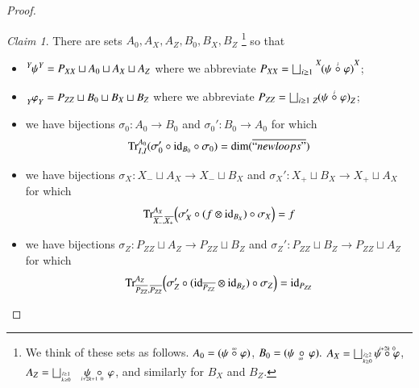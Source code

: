 \documentclass{amsart}
\def\tn{\textnormal}
\def\dim{\tn{dim}}
\def\Trace{\tn{Tr}}
\def\to{\rightarrow}
\def\ol{\overline}
\def\id{\tn{id}}
\newcommand{\inp}[1]{{#1_-}}
\newcommand{\outp}[1]{{#1_+}}
\newcommand{\feeddd}[3]{{\tensor*[^{#2}_{\color{white}{!}}]{{#1}}{^{#3}}}}%
\newcommand{\feedcc}[3]{{\tensor*[^{\color{white}{!}}_{#2}]{{#1}}{_{#3}}}}
\theoremstyle{remark}
\newtheorem{claim}[subsubsection]{Claim}
\theoremstyle{definition}
\begin{document}
\begin{proof}
\begin{claim}
 There are sets $A_0,A_X,A_Z,B_0,B_X,B_Z$%
 \footnote{We think of these sets as follows. $A_0=(\psi\;\accentset{\infty}{\circ}\;\varphi)$, $B_0=(\psi\,\underaccent{\;\ \infty}{\circ}\,\varphi).$ $A_X=\bigsqcup_{\substack{\scriptscriptstyle i\ge2\\ \scriptscriptstyle k\ge0}}\psi\;\accentset{i+2k\ 0}{\circ}\;\varphi$, $A_Z=\bigsqcup_{\substack{\scriptscriptstyle i\ge1\\ \scriptscriptstyle k\ge0}}\quad\psi\;\underaccent{i+2k+1\ 0\ \ \ }{\circ}\;\varphi$, and similarly for $B_X$ and $B_Z$.
}
so that
 \begin{itemize}
  \item $\feeddd{\psi}{Y}{Y}=P_{XX}\sqcup A_0\sqcup A_X\sqcup A_Z$ where we abbreviate $P_{XX}=\bigsqcup_{i\ge1}\feeddd{(\psi\;\accentset{i}{\circ}\;\varphi)}{X}{X}$;
  \item $\feedcc{\varphi}{Y}{Y}=P_{ZZ}\sqcup B_0\sqcup B_X\sqcup B_Z$ where we abbreviate $P_{ZZ}=\bigsqcup_{i\ge1}\feedcc{(\psi\;\accentset{i}{\circ}\;\varphi)}{Z}{Z}$;
  \item we have bijections $\sigma_0:A_0\to B_0$ and $\sigma_0':B_0\to A_0$ for which
  \[\Trace_{I,I}^{A_0}(\sigma_0'\circ\id_{B_0}\circ\sigma_0)=\dim(\ol{``newloops"})\]
  \item we have bijections $\sigma_X:\inp{X}\sqcup A_X\to \inp{X}\sqcup B_X$ and $\sigma_X':\outp{X}\sqcup B_X\to \outp{X}\sqcup A_X$ for which
  \[\Trace_{\ol{\inp{X}},\ol{\outp{X}}}^{A_X}\Big(\sigma_X'\circ(f\otimes\id_{B_X})\circ\sigma_X\Big)=f\]
  \item we have bijections $\sigma_Z:P_{ZZ}\sqcup A_Z\to P_{ZZ}\sqcup B_Z$ and $\sigma_Z':P_{ZZ}\sqcup B_Z\to P_{ZZ}\sqcup A_Z$ for which
  \[\Trace_{\ol{P_{ZZ}},\ol{P_{ZZ}}}^{A_Z}\Big(\sigma_Z'\circ(\id_{\ol{P_{ZZ}}}\otimes\id_{B_Z})\circ\sigma_Z\Big)=\id_{P_{ZZ}}\]
 \end{itemize}
\end{claim}


\end{proof}
\end{document}
